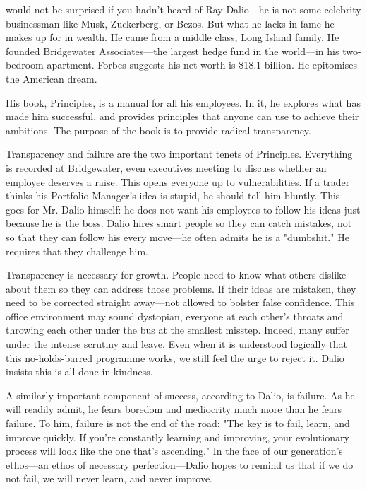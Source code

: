 \label{ch:principles}

{\flushright{}}
\smallskip

would not be surprised if you hadn't heard of Ray Dalio---he is not
   some celebrity businessman like Musk, Zuckerberg, or Bezos. But what he
   lacks in fame he makes up for in wealth. He came from a middle
   class, Long Island family. He founded Bridgewater Associates---the
   largest hedge fund in the world---in his two-bedroom apartment. Forbes
   suggests his net worth is \$18.1 billion. He epitomises the American
   dream.

   His book, Principles, is a manual for all his employees. In it, he
   explores what has made him successful, and provides principles that
   anyone can use to achieve their ambitions. The
   purpose of the book is to provide radical transparency.

   Transparency and failure are the two important tenets of Principles.
   Everything is recorded at Bridgewater, even executives meeting to
   discuss whether an employee deserves a raise. This opens everyone up
   to vulnerabilities. If a trader thinks his Portfolio Manager's idea is
   stupid, he should tell him bluntly. This goes for Mr. Dalio himself: he
   does not want his employees to follow his ideas just because he is the
   boss. Dalio hires smart people so they can catch mistakes, not so that
   they can follow his every move---he often admits he is a "dumbshit."
   He requires that they challenge him.

   Transparency is necessary for growth. People need to know what others
   dislike about them so they can address those problems. If their ideas
   are mistaken, they need to be corrected straight away---not allowed to
   bolster false confidence. This office environment may sound dystopian,
   everyone at each other's throats and throwing each other under the bus
   at the smallest misstep. Indeed, many suffer under the intense scrutiny
   and leave. Even when it is understood logically that this no-holds-barred programme works, we still feel the urge to reject
   it. Dalio insists this is all done in kindness.

   A similarly important component of success, according to Dalio, is
   failure. As he will readily admit, he fears boredom and mediocrity much
   more than he fears failure. To him, failure is not the end of the road:
   "The key is to fail, learn, and improve quickly. If you're constantly
   learning and improving, your evolutionary process will look like the
   one that's ascending." In the face of our generation's ethos---an
   ethos of necessary perfection---Dalio hopes to remind us that if we do
   not fail, we will never learn, and never improve.

